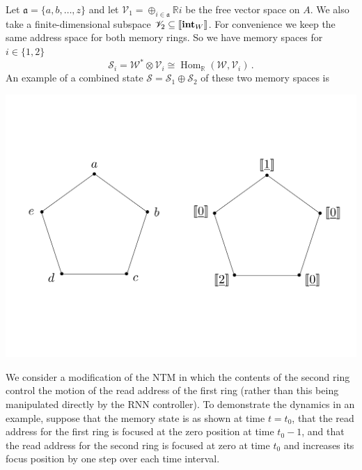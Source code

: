 \documentclass[english,letter paper,12pt,leqno]{article}
\theoremstyle{example}
\numberwithin{equation}{section}
\def\Hom{\operatorname{Hom}}
\begin{document}
Let $\mathfrak{a} = \{a,b,\ldots,z\}$ and let $\mathscr{V}_1 = \oplus_{i \in \mathfrak{a}} \mathbb{R} i$ be the free vector space on $A$. We also take a finite-dimensional subspace $\mathscr{V}_2 \subseteq \llbracket \textbf{int}_W \rrbracket$. For convenience we keep the same address space for both memory rings. So we have memory spaces for $i \in \{1,2\}$
\[
\mathscr{S}_i = \mathscr{W}^* \otimes \mathscr{V}_i \cong \Hom_{\mathbb{R}}(\mathscr{W}, \mathscr{V}_i)\,.
\]
An example of a combined state $\mathscr{S} = \mathscr{S}_1 \oplus \mathscr{S}_2$ of these two memory spaces is
\begin{center}
\includegraphics[scale=0.3]{dia2}
\end{center}
We consider a modification of the NTM in which the contents of the second ring control the motion of the read address of the first ring (rather than this being manipulated directly by the RNN controller). To demonstrate the dynamics in an example, suppose that the memory state is as shown at time $t = t_0$, that the read address for the first ring is focused at the zero position at time $t_0 - 1$, and that the read address for the second ring is focused at zero at time $t_0$ and increases its focus position by one step over each time interval. 
\end{document}
